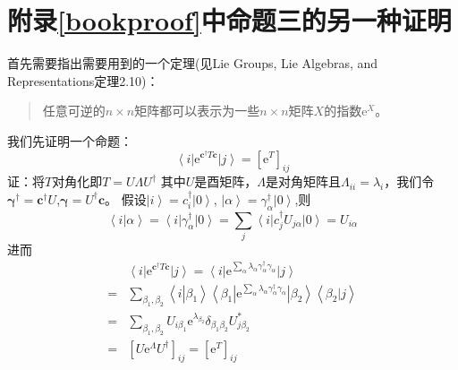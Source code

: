 \documentclass[UTF8,cs4size]{ctexart}
\def\ee{\mathrm e}
\begin{document}
\section{附录\ref{bookproof}中命题三的另一种证明}
首先需要指出需要用到的一个定理(见Lie Groups, Lie Algebras, and Representations定理2.10)：
\begin{quote}
    任意可逆的$n \times n$矩阵都可以表示为一些$n \times n$矩阵$X$的指数$\ee^{X}$。
\end{quote}
我们先证明一个命题：
\[
    \left< i \right| \ee^{\mathbf{c^{\dag}} T \mathbf{c}} \left| j \right>
    =\left[ \ee^{T} \right]_{ij}
\]
证：将$T$对角化即$T=U \Lambda U^{\dag}$ 其中$U$是酉矩阵，$\Lambda$是对角矩阵且$\Lambda_{ii}=\lambda_{i}$，我们令
$\boldsymbol{\gamma^{\dag}}=\mathbf{c^{\dag}} U$,$\boldsymbol{\gamma}=U^{\dag} \mathbf{c}$。
假设$\left| i \right> = c^{\dag}_{i} \left| 0 \right>$,
$\left | \alpha \right> = \gamma^{\dag}_{\alpha} \left| 0 \right>$,则
\[
    \left < i \right| \left. \alpha \right> =\left < i \right|  \gamma^{\dag}_{\alpha} \left| 0 \right>
    = \sum_{j} \left < i \right| c^{\dag}_{j} U_{j \alpha}  \left| 0 \right>
    = U_{i\alpha}
\]
进而
\[
    \begin{aligned}
        &\left< i \right| \ee^{\mathbf{c^{\dag}} T \mathbf{c}} \left| j \right>
        =\left< i \right| \ee^{\sum_{\alpha} \lambda_{\alpha} \gamma^{\dag}_{\alpha} \gamma_{\alpha}} \left| j \right>\\
        =&\sum_{\beta_1,\beta_2} \left< i \left| \beta_1 \right. \right>
        \left< \beta_1 \right| \ee^{\sum_{\alpha} \lambda_{\alpha} \gamma^{\dag}_{\alpha} \gamma_{\alpha}} 
        \left| \beta_2 \right>  \left<\beta_2 \left| j \right. \right> \\
        =&\sum_{\beta_1,\beta_2} U_{i\beta_1} \ee^{\lambda_{\beta_2}} \delta_{\beta_1 \beta_2}
        U^{*}_{j\beta_2}\\
        =&\left[ U \ee^{\Lambda} U^{\dag} \right]_{ij} = \left[ \ee^{T} \right]_{ij}
    \end{aligned}    
\]
\fi
\end{document}
